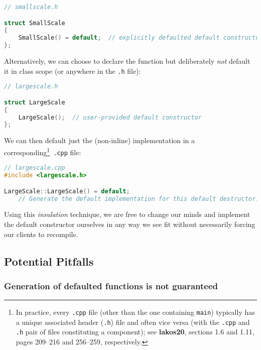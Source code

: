 \begin{lstlisting}[language=C++]
// smallscale.h

struct SmallScale
{
    SmallScale() = default;  // explicitly defaulted default constructor
};
\end{lstlisting}

\noindent Alternatively, we can choose to declare the function but deliberately
\emph{not} default it in class scope (or anywhere in the \texttt{.h}
file):

\begin{lstlisting}[language=C++]
// largescale.h

struct LargeScale
{
    LargeScale();  // user-provided default constructor
};
\end{lstlisting}

\noindent We can then default just the (non-inline) implementation in a
corresponding{\cprotect\footnote{In practice, every \texttt{.cpp} file
(other than the one containing \texttt{main}) typically has a unique
associated header (\texttt{.h}) file and often vice versa  (with the \texttt{.cpp} and \texttt{.h} pair of files constituting a component); see \textbf{{lakos20}}, sections 1.6 and 1.11,
  pages 209--216 and 256--259, respectively.}}~\texttt{.cpp} file:

\begin{lstlisting}[language=C++]
// largescale.cpp
#include <largescale.h>

LargeScale::LargeScale() = default;
    // Generate the default implementation for this default destructor.
\end{lstlisting}

\noindent Using this \emph{insulation} technique, we are free to change our minds
and implement the default constructor ourselves in any way we see fit
without necessarily forcing our clients to recompile.

\subsection[Potential Pitfalls]{Potential Pitfalls}\label{potential-pitfalls}

\subsubsection[Generation of defaulted functions is not guaranteed]{Generation of defaulted functions is not guaranteed}\label{generation-of-defaulted-functions-is-not-guaranteed}

